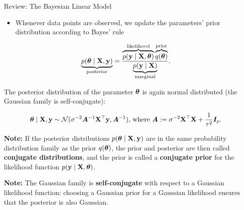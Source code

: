 \begin{frame}[c, allowframebreaks]{Review: The Bayesian Linear Model}
\begin{itemize}
\lz
\lz

\item Whenever data points are observed, we update the parameters' prior distribution according to Bayes' rule

\end{itemize}




$$
\underbrace{p(\bm{\theta} \mid \mathbf{X}, \mathbf{y})}_{\text{posterior}} = \frac{\overbrace{p(\mathbf{y} \mid \mathbf{X}, \bm{\theta})}^{\text{likelihood}}\overbrace{q(\bm{\theta})}^{\text{prior}}}{\underbrace{p(\mathbf{y}\mid\mathbf{X})}_{\text{marginal}}}.
$$


\framebreak

The posterior distribution of the parameter $\bm{\theta}$ is again normal distributed (the Gaussian family is self-conjugate): 

$$
\bm{\theta} \mid \mathbf{X}, \mathbf{y} \sim \mathcal{N}(\sigma^{-2}\bm{A}^{-1}\mathbf{X}^\top\mathbf{y}, \bm{A}^{-1})\text{, where }\bm{A}:= \sigma^{-2}\mathbf{X}^\top\mathbf{X} + \frac{1}{\tau^2} \boldsymbol{I}_p.
$$


\lz 

\begin{footnotesize}
\textbf{Note:} If the posterior distributions $p(\bm{\theta}\mid\mathbf{X}, \mathbf{y})$ are in the same probability distribution family as the prior $q(\bm{\theta})$, the prior and posterior are then called \textbf{conjugate distributions}, and the prior is  called a \textbf{conjugate prior} for the likelihood function $p(\mathbf{y}\mid\mathbf{X}, \bm{\theta})$. 
\end{footnotesize}

\lz

\begin{footnotesize}
\textbf{Note:} The Gaussian family is \textbf{self-conjugate} with respect to a Gaussian likelihood function: choosing a Gaussian prior for a Gaussian likelihood ensures that the posterior is also Gaussian.
\end{footnotesize}


\framebreak


\end{frame}
